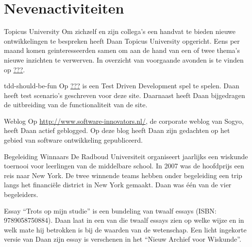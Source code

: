 \section*{Nevenactiviteiten}

	\begin{subActivityList}
		\item[Topicus University] Om zichzelf en zijn collega's een handvat te
		bieden nieuwe ontwikkelingen te bespreken heeft Daan Topicus University
		opgericht. Eens per maand komen geinteresseerden samen om aan de hand
		van een of twee thema's nieuwe inzichten te verwerven. In overzicht
		van voorgaande avonden is te vinden op \url{???}.
	
		\item[tdd-should-be-fun] Op \url{???} is een Test Driven Development spel
		te spelen. Daan heeft test scenario's geschreven voor deze site. 
		Daarnaast heeft Daan bijgedragen de uitbreiding van de functionaliteit
		van de site.\hfill\\
	
		\item[Weblog] Op \url{http://www.software-innovators.nl/}, de corporate
		weblog van Sogyo, heeft Daan actief geblogged. Op deze blog heeft
		Daan zijn gedachten op het gebied van software ontwikkeling gepubliceerd.
		\hfill\\
		
		\item[Begeleiding Winnaars] De Radboud Universiteit organiseert 
		jaarlijks een wiskunde toernooi voor leerlingen van de middelbare 
		school. In 2007 was de hoofdprijs een reis naar New York. De twee 
		winnende teams hebben onder begeleiding een trip langs het financi\"ele 
		district in New York gemaakt. Daan was \'e\'en van de vier begeleiders.
		\hfill\\
		
		\item[Essay] ``Trots op mijn studie'' is een bundeling van twaalf essays 
		(ISBN: 9789058750884). Daan laat in een van die twaalf essays zien op 
		welke wijze en in welk mate hij betrokken is bij de waarden van de 
		wetenschap.
		Een licht ingekorte versie van Daan zijn essay is verschenen in het 
		``Nieuw Archief voor Wiskunde''.		
		\hfill\\
	\end{subActivityList}

